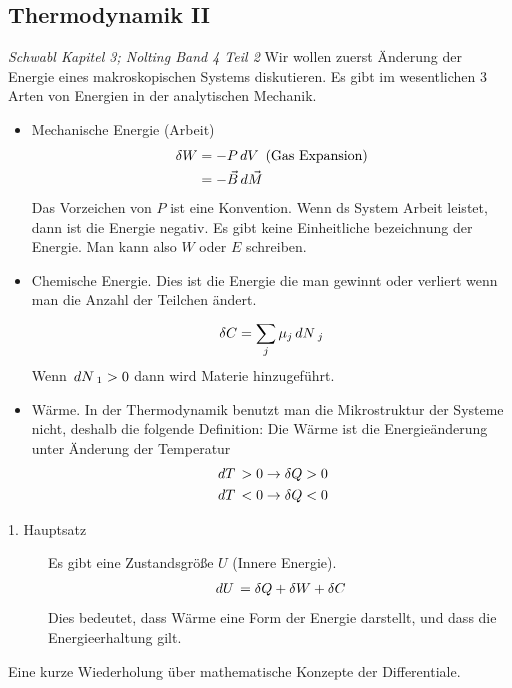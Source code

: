 \subsection*{Thermodynamik II}
\emph{Schwabl Kapitel 3; Nolting Band 4 Teil 2}
Wir wollen zuerst \"Anderung der Energie eines makroskopischen Systems diskutieren.
Es gibt im wesentlichen 3 Arten von Energien in der analytischen Mechanik.

\begin{itemize}
  \item Mechanische Energie (Arbeit)
    \begin{align*}
      \delta W & = - P \,dV\, \text{ (Gas Expansion)} \\
               & = - \vec{B} \,d\vec{M}\,
    \end{align*}
    Das Vorzeichen von $P$ ist eine Konvention. Wenn ds System Arbeit leistet,
    dann ist die Energie negativ.
    Es gibt keine Einheitliche bezeichnung der Energie. Man kann also 
    $W$ oder $E$ schreiben.
    
  \item  Chemische Energie. Dies ist die Energie die man gewinnt oder verliert
    wenn man die Anzahl der Teilchen \"andert.
    \begin{align*}
      \delta C = \sum_{j}^{} \mu_j \,dN\,_j
    \end{align*}
    Wenn $ \,dN\,_1 > 0$ dann wird Materie hinzugeführt.
  \item Wärme. In der Thermodynamik benutzt man die Mikrostruktur der Systeme
    nicht, deshalb die folgende Definition: Die Wärme ist die Energieänderung
    unter Änderung der Temperatur
    \begin{align*}
      \,dT\, > 0 \to \delta Q > 0 \\
      \,dT\, < 0 \to \delta Q < 0 \\
    \end{align*}
\end{itemize}
\begin{description}
  \item[1. Hauptsatz] Es gibt eine Zustandsgr\"o\ss{}e $U$ (Innere Energie).
    \begin{align*}
      \,dU\, = \delta Q + \delta W + \delta C
    \end{align*}
    Dies bedeutet, dass W\"arme eine Form der Energie darstellt, und
    dass die Energieerhaltung gilt.
\end{description}
Eine kurze Wiederholung \"uber mathematische Konzepte der Differentiale.
